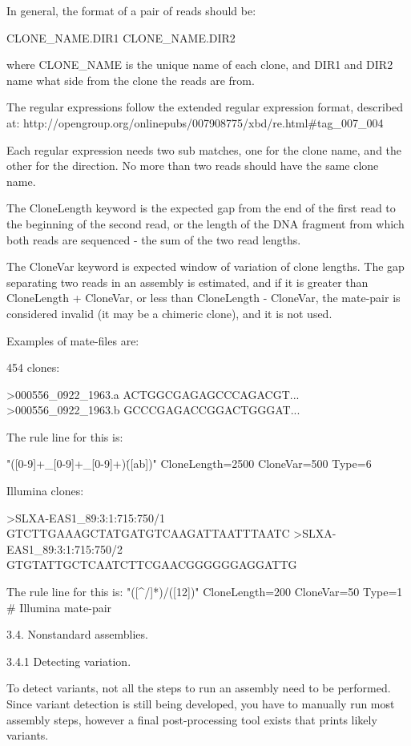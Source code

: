 \documentclass{article}[12pt]
\begin{document}
	In general, the format of a pair of reads	should be:
  
	CLONE\_NAME.DIR1
	CLONE\_NAME.DIR2

	where CLONE\_NAME is the unique name of each clone, and DIR1 and DIR2
	name what side from the clone the reads are from.

	The regular expressions follow the extended regular expression
	format, described at:
http://opengroup.org/onlinepubs/007908775/xbd/re.html#tag\_007\_004

  Each regular expression needs two sub matches, one for the clone
  name, and the other for the direction.  No more than two reads
  should have the same clone name.
	
  The CloneLength keyword is the expected gap from the end of the
  first read to the beginning of the second read, or the length of the
  DNA fragment from which both reads are sequenced - the sum of the
  two read lengths.

	The CloneVar keyword is expected window of variation of clone
	lengths.  The gap separating two reads in an assembly is estimated,
	and if it is greater than CloneLength + CloneVar, or less than
	CloneLength - CloneVar, the mate-pair is considered invalid (it may
	be a chimeric clone), and it is not used.

  

 Examples of mate-files are:


454 clones:
	
>000556\_0922\_1963.a
ACTGGCGAGAGCCCAGACGT...
>000556\_0922\_1963.b
GCCCGAGACCGGACTGGGAT...

The rule line for this is:

"([0-9]+\_[0-9]+\_[0-9]+)\.([ab])" CloneLength=2500 CloneVar=500 Type=6

Illumina clones:

>SLXA-EAS1\_89:3:1:715:750/1
GTCTTGAAAGCTATGATGTCAAGATTAATTTAATC
>SLXA-EAS1\_89:3:1:715:750/2
GTGTATTGCTCAATCTTCGAACGGGGGGAGGATTG

The rule line for this is:
"([^/]*)/([12])" CloneLength=200 CloneVar=50 Type=1      # Illumina mate-pair


	3.4. Nonstandard assemblies.
	
	3.4.1 Detecting variation.

	To detect variants, not all the steps to run an assembly need to be
	performed.  Since variant detection is still being developed, you
	have to manually run most assembly steps, however a final
	post-processing tool exists that prints likely variants.
\end{document}

